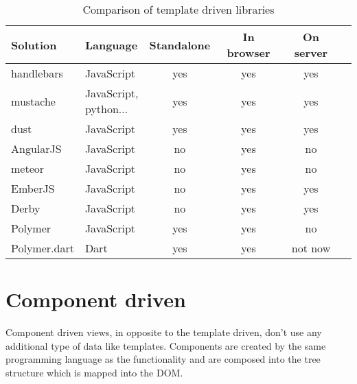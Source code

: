 \documentclass[oneside, 12pt]{book}
\begin{document}
	\begin{table}
		\begin{tabular}{|l|l|c|c|c|c|}
			\hline
			\textbf{Solution}& \textbf{Language}   & \textbf{Standalone} & \textbf{In browser} & \textbf{On server} \\
			\hline
			handlebars       & JavaScript          &         yes         &        yes          &        yes         \\
			\hline
			{{mustache}}     & \shortstack{JavaScript,  
														\\		python...} &        yes         &        yes          &        yes          \\
			\hline
			dust             & JavaScript          &         yes         &        yes          &        yes         \\
			\hline
			AngularJS        & JavaScript          &         no          &        yes          &        no          \\
			\hline
			meteor           & JavaScript          &         no          &        yes          &        no          \\
			\hline
			EmberJS          & JavaScript          &         no          &        yes          &        yes         \\
			\hline
			Derby            & JavaScript          &         no          &        yes          &        yes         \\
			\hline
			Polymer          & JavaScript          &         yes         &        yes          &        no          \\
			\hline
			Polymer.dart     & Dart                &         yes         &        yes          &      not now       \\
			\hline
		\end{tabular}
		\caption{Comparison of template driven libraries}
		\label{table:template-driven-libraries}
	\end{table}

\section{Component driven}\label{sec:existing-component}

	Component driven views, in opposite to the template driven, don't use any additional type of data like templates. 
	Components are created by the same programming language as the functionality and 
	are composed into the tree structure which is mapped into the DOM. 
\end{document}
